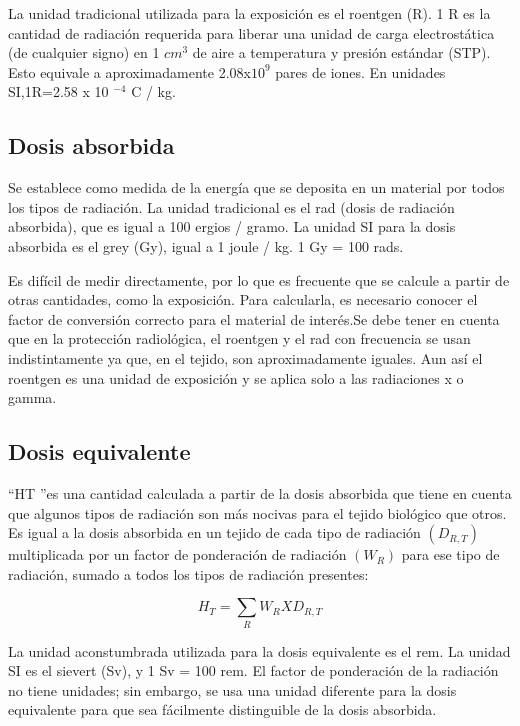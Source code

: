 \documentclass[12pt,fleqn]{book} %
\numberwithin{equation}{section} %
\numberwithin{figure}{section} %
\numberwithin{table}{section} %
\begin{document}
{La unidad tradicional utilizada para la exposición es el roentgen (R). 1 R es la cantidad de radiación requerida para liberar una unidad de carga electrostática (de cualquier signo) en 1 $cm^{3}$ de aire a temperatura y presión estándar (STP).  Esto equivale a aproximadamente 2.08x$10^{9}$ pares de iones. En unidades SI,1R=2.58 x 10 $^{-4}$ C / kg.

\subsection{Dosis absorbida}
Se establece como medida de la energía que se deposita en un material por todos los tipos de radiación. La unidad tradicional es el rad (dosis de radiación absorbida), que es igual a 100 ergios / gramo. La unidad SI para la dosis absorbida es el grey (Gy), igual a 1 joule / kg. 1 Gy = 100 rads.

Es difícil de medir directamente, por lo que es frecuente que se calcule a partir de otras cantidades, como la exposición. Para calcularla, es necesario conocer el factor de conversión correcto para el material de interés.Se debe tener en cuenta que en la protección radiológica, el roentgen y el rad con frecuencia se usan indistintamente ya que, en el tejido, son aproximadamente iguales. Aun así el roentgen es una unidad de exposición y se aplica solo a las radiaciones x o gamma.

\subsection{Dosis equivalente}
\textquotedblleft HT \textquotedblright es una cantidad calculada a partir de la dosis absorbida que tiene en cuenta que algunos tipos de radiación son más nocivas para el tejido biológico que otros. Es igual a la dosis absorbida en un tejido de cada tipo de radiación $(D_{R,T})$ multiplicada por un factor de ponderación de radiación $(W_{R})$ para ese tipo de radiación, sumado a todos los tipos de radiación presentes:

\begin{equation}
 H_{T}=\sum_{R} W_{R} X  D_{R,T}
\end{equation}

La unidad aconstumbrada utilizada para la dosis equivalente es el rem. La unidad SI es el sievert (Sv), y 1 Sv = 100 rem. El factor de ponderación de la radiación no tiene unidades; sin embargo, se usa una unidad diferente para la dosis equivalente para que sea fácilmente distinguible de la dosis absorbida.

}
\end{document}

